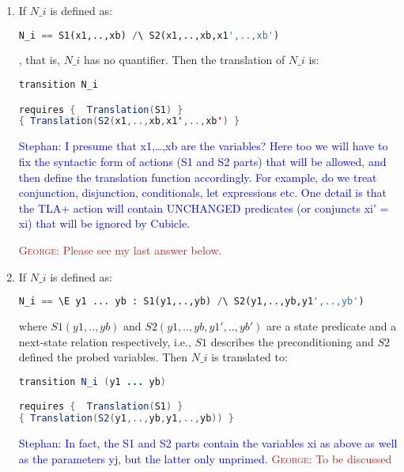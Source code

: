 \documentclass{article}
\theoremstyle{plain}
\numberwithin{equation}{section}
\newcommand{\george}[1]{\textcolor{brown}{\textsc{George: } {\sf #1}}}
\newcommand{\ste}[1]{\par\noindent\textcolor{blue}{\small Stephan: #1}}
\begin{document}
\begin{enumerate}

\item If  $N\_i$ is defined as:

\begin{lstlisting}[language=Python]
N_i == S1(x1,..,xb) /\ S2(x1,..,xb,x1',..,xb')
\end{lstlisting}
, that is, $N\_i$ has no quantifier. Then the translation of  $N\_i$ is: 


\begin{lstlisting}[language=Java]
transition N_i 

requires {  Translation(S1) }
{ Translation(S2(x1,..,xb,x1',..,xb') }

\end{lstlisting}







\ste{I presume that x1,\dots,xb are the variables? Here too we will have to fix
  the syntactic form of actions (S1 and S2 parts) that will be allowed, and then
  define the translation function accordingly. For example, do we treat
  conjunction, disjunction, conditionals, let expressions etc.
  One detail is that the TLA+ action will contain UNCHANGED predicates (or
  conjuncts xi' = xi) that will be ignored by Cubicle.}

  \george{Please see my last answer below.  }

\item If  $N\_i$ is defined as:

\begin{lstlisting}[language=Python]
N_i == \E y1 ... yb : S1(y1,..,yb) /\ S2(y1,..,yb,y1',..,yb')
\end{lstlisting}

where $S1(y1,..,yb)$  and $S2(y1,..,yb,y1',..,yb')$  are a state predicate and a next-state relation respectively, i.e., $S1$ describes the preconditioning and $S2$ defined the probed variables. Then  $N\_i$ is translated to: 

\begin{lstlisting}[language=Java]
transition N_i (y1 ... yb) 

requires {  Translation(S1) }
{ Translation(S2(y1,..,yb,y1,..,yb)) }

\end{lstlisting}

\ste{In fact, the S1 and S2 parts contain the variables xi as above as well as
  the parameters yj, but the latter only unprimed.}
  \george{To be discussed}


\end{enumerate}
\end{document}
